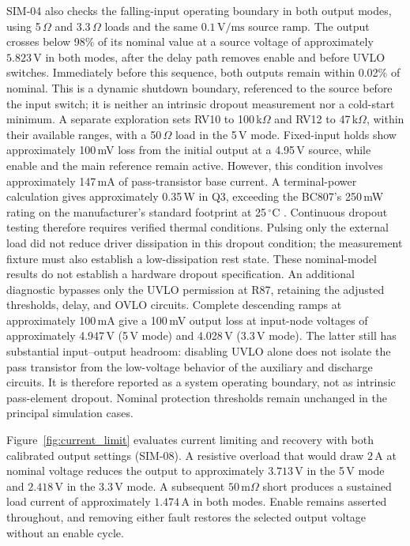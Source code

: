 \documentclass[conference]{IEEEtran}
\begin{document}
SIM-04 also checks the falling-input operating boundary in both
output modes, using 5\,$\Omega$ and 3.3\,$\Omega$ loads and the
same \(0.1\,\mathrm{V/ms}\) source ramp. The output crosses below
98\% of its nominal value at a source voltage of approximately
\(5.823\,\mathrm{V}\) in both modes, after the delay path removes
enable and before UVLO switches. Immediately before this sequence,
both outputs remain within 0.02\% of nominal. This is a dynamic
shutdown boundary, referenced to the source before the input switch;
it is neither an intrinsic dropout measurement nor a cold-start
minimum. A separate exploration sets RV10 to 100\,k$\Omega$ and
RV12 to 47\,k$\Omega$, within their available ranges, with
a 50\,$\Omega$ load in the 5\,V mode. Fixed-input
holds show approximately 100\,mV loss from the initial output
at a 4.95\,V source, while enable and the main reference
remain active. However, this condition involves approximately
147\,mA of pass-transistor base current. A terminal-power calculation
gives approximately 0.35\,W in Q3, exceeding the BC807's 250\,mW
rating on the manufacturer's standard footprint at 25\,$^\circ$C
\cite{nexperia_bc807_2022}. Continuous dropout testing therefore
requires verified thermal conditions. Pulsing only the external load
did not reduce driver dissipation in this dropout condition; the
measurement fixture must also establish a low-dissipation rest state.
These nominal-model results do not establish a hardware dropout
specification.
An additional diagnostic bypasses only the UVLO permission at R87,
retaining the adjusted thresholds, delay, and OVLO circuits. Complete
descending ramps at approximately 100\,mA give a 100\,mV output loss
at input-node voltages of approximately 4.947\,V (5\,V mode) and
4.028\,V (3.3\,V mode). The latter still has substantial input--output
headroom: disabling UVLO alone does not isolate the pass transistor
from the low-voltage behavior of the auxiliary and discharge circuits.
It is therefore reported as a system operating boundary, not as
intrinsic pass-element dropout. Nominal protection thresholds remain
unchanged in the principal simulation cases.





Figure~\ref{fig:current_limit} evaluates current limiting and recovery
with both calibrated output settings (SIM-08). A resistive overload
that would draw \(2\,\mathrm{A}\) at nominal voltage reduces the
output to approximately \(3.713\,\mathrm{V}\) in the 5\,V mode
and \(2.418\,\mathrm{V}\) in the 3.3\,V mode. A subsequent
\(50\,\mathrm{m}\Omega\) short produces a sustained load current
of approximately \(1.474\,\mathrm{A}\) in both modes.
Enable remains asserted throughout, and removing either fault
restores the selected output voltage without an enable cycle.
\end{document}
